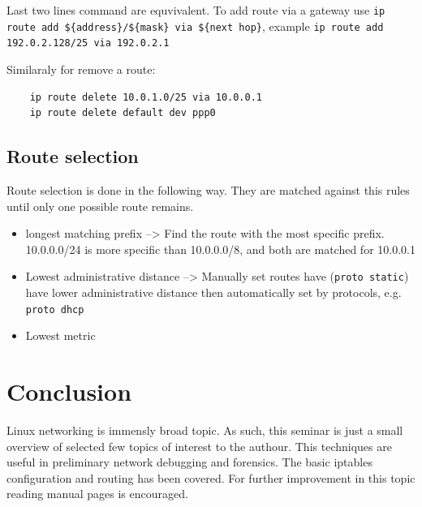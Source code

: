 \documentclass[times, utf8, seminar, english]{fer}
\begin{document}
Last two lines command are equvivalent. To add route via a gateway use \verb|ip route add ${address}/${mask} via ${next hop}|, example
\verb|ip route add 192.0.2.128/25 via 192.0.2.1|

Similaraly for remove a route:
\begin{verbatim}
    ip route delete 10.0.1.0/25 via 10.0.0.1
    ip route delete default dev ppp0
\end{verbatim}

\section{Route selection}
\label{sec:route-sel}
Route selection is done in the following way. They are matched against this rules until only one possible route remains.
\begin{itemize}
    \item longest matching prefix --> Find the route with the most specific prefix. 10.0.0.0/24 is more specific than 10.0.0.0/8, and both are matched for 10.0.0.1
    \item Lowest administrative distance --> Manually set routes have (\verb|proto static|) have lower administrative distance then automatically set by protocols, e.g. \verb|proto dhcp|
    \item Lowest metric
\end{itemize}

\chapter{Conclusion}

Linux networking is immensly broad topic. As such, this seminar is just a small overview of selected few topics of interest to the authour. This techniques are useful in preliminary network debugging and forensics. The basic iptables configuration and routing has been covered. For further improvement in this topic reading manual pages is encouraged.



\end{document}
